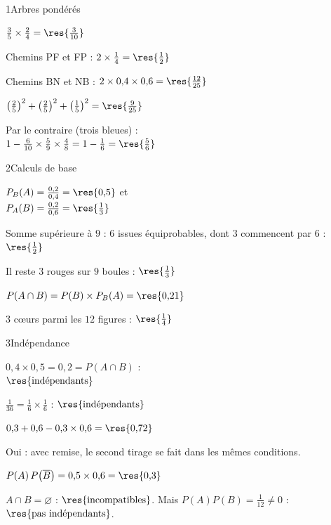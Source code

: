 

\begin{deuxcolonnes}

\begin{corrige}{1}{Arbres pondérés}
\begin{questions}
  \item $\frac35\times\frac24=\res{\frac{3}{10}}$
  \item Chemins PF et FP : $2\times\frac14=\res{\frac12}$
  \item Chemins BN et NB : $2\times0{,}4\times0{,}6=\res{\frac{12}{25}}$
  \item $\left(\frac25\right)^{2}+\left(\frac25\right)^{2}+\left(\frac15\right)^{2}=\res{\frac{9}{25}}$
  \item Par le contraire (trois bleues) :\\ $1-\frac{6}{10}\times\frac59\times\frac48=1-\frac16=\res{\frac56}$
\end{questions}
\end{corrige}

\begin{corrige}{2}{Calculs de base}
\begin{questions}
  \item $P_B(A)=\frac{0{,}2}{0{,}4}=\res{0{,}5}$ et\\ $P_A(B)=\frac{0{,}2}{0{,}6}=\res{\frac13}$
  \item Somme supérieure à $9$ : $6$ issues équiprobables, dont $3$ commencent par $6$ : $\res{\frac12}$
  \item Il reste $3$ rouges sur $9$ boules : $\res{\frac13}$
  \item $P(A\cap B)=P(B)\times P_B(A)=\res{0{,}21}$
  \item $3$ cœurs parmi les $12$ figures : $\res{\frac14}$
\end{questions}
\end{corrige}

\begin{corrige}{3}{Indépendance}
\begin{questions}
  \item $0{,}4\times0{,}5=0{,}2=P(A\cap B)$ :\\ $\res{\text{indépendants}}$
  \item $\frac{1}{36}=\frac16\times\frac16$ : $\res{\text{indépendants}}$
  \item $0{,}3+0{,}6-0{,}3\times0{,}6=\res{0{,}72}$
  \item Oui : avec remise, le second tirage se fait dans les mêmes conditions.
  \item $P(A)\,P\big(\overline B\big)=0{,}5\times0{,}6=\res{0{,}3}$
  \item $A\cap B=\varnothing$ : $\res{\text{incompatibles}}$. Mais $P(A)P(B)=\frac1{12}\neq0$ : $\res{\text{pas indépendants}}$.
\end{questions}
\end{corrige}


\end{deuxcolonnes}
